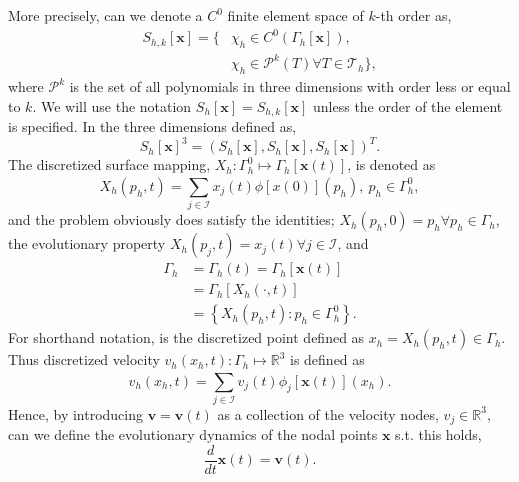 More precisely, can we denote a $C^{0}$ finite element space of $k$-th order as,
\begin{equation*}
    \begin{split}
S_{h,k}\left[ \mathbf{x} \right]   =   \{ & \chi  _{h} \in C^{0}\left( \Gamma _{h}\left[ \mathbf{x} \right]  \right),  \\
&\chi _{h} \in \mathcal{P}^{k }\left( T \right) \forall T \in \mathcal{T}_{h}           \},
    \end{split}
\end{equation*}
where $\mathcal{P}^{k} $ is the set of all polynomials in three dimensions with order less or equal to $k$. We will use the notation $S_{h}\left[ \mathbf{x} \right] = S_{h,k}\left[ \mathbf{x} \right] $ unless the order of the element is specified. In
the three dimensions defined as, \[
S_{h}\left[ \mathbf{x} \right] ^{3}  =
(
S_{h}\left[ \mathbf{x} \right],
S_{h}\left[ \mathbf{x} \right],
S_{h}\left[ \mathbf{x} \right]
)^{T}.
\]
The discretized surface mapping, $X_{h}: \Gamma_{h} ^{0} \mapsto  \Gamma _{h} \left[ \mathbf{x}\left( t \right)  \right] $, is denoted as \[
X_{h}\left( p_{h},t \right) = \sum_{j \in \mathcal{I} }^{}  x_{j}\left( t \right)  \phi \left[ x\left( 0 \right)  \right] \left( p_{h} \right), \  p_{h} \in \Gamma ^{0}_{h},
\]
and the problem obviously does satisfy the identities; $X_{h}\left( p_{h},0 \right)  = p_{h} \forall p_{h} \in \Gamma _{h}$, the evolutionary property $X_{h} \left( p_{j}, t \right)  = x_{j}\left( t \right)  \forall j \in \mathcal{I} $, and
\[
    \begin{split}
        \Gamma _{h} & = \Gamma_{h} \left( t \right) =   \Gamma_{h} \left[ \mathbf{x}\left( t \right)  \right]  \\
                                    &= \Gamma_{h}\left[ X_{h}\left( \cdot ,t \right)  \right] \\
&=\left\{ X_{h}\left( p_{h},t \right): p_{h} \in  \Gamma ^{0}_{h} \right\}.
    \end{split}
\]
For shorthand notation, is the discretized point defined as $x_{h} = X_{h}\left( p_{h},t \right) \in \Gamma _{h} $.
Thus discretized velocity $v_{h}\left( x_{h},t \right): \Gamma _{h} \mapsto  \mathbb{R} ^{3} $ is defined as \[
    v_{h}\left( x_{h},t \right)  = \sum_{j \in \mathcal{I} }^{} v_{j}\left( t \right) \phi _{j}\left[ \mathbf{x}\left( t \right)  \right] \left( x_{h} \right).
\]
Hence, by introducing  $\mathbf{v} = \mathbf{v}\left( t \right)  $ as a collection of the velocity nodes,  $v_{j} \in \mathbb{R} ^3$, can we define the evolutionary dynamics of the nodal points $\mathbf{x}$ s.t. this holds,
\[
\frac{d}{dt}\mathbf{x}\left( t \right) = \mathbf{v}\left( t \right).
\]

